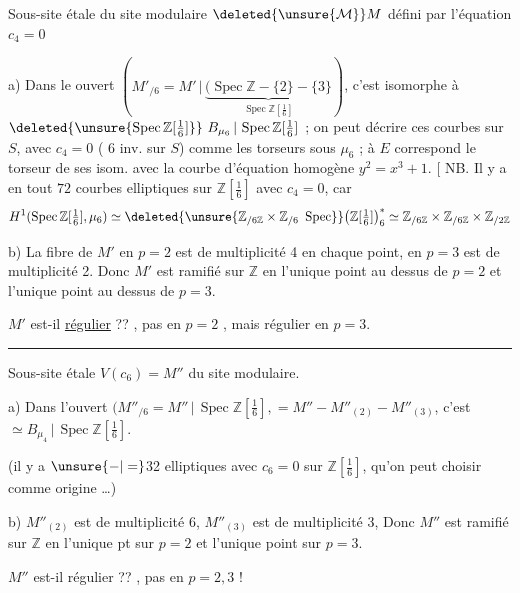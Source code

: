 Sous-site étale  du site modulaire $\deleted{\unsure{\mathcal M}}M$ défini par l'équation $c_4=0$

a) Dans le  ouvert $(M'_{/6}=M'\,|\,\underbrace{(\operatorname{Spec}\mathbb Z-\{2\}-\{3\}}_{\operatorname{Spec}\mathbb Z[\frac16]})$, c'est isomorphe à $\deleted{\unsure{\operatorname{Spec}\mathbb Z[\tfrac16]}}\ B_{\mu_6}\,|\,\operatorname{Spec}\mathbb Z[\tfrac16]$ ; on peut  décrire  ces courbes  sur $S$, avec $c_4=0$ ( $6$ inv. sur $S$) comme les torseurs sous $\mu_6$ ; à $E$ correspond le torseur de ses isom. avec la courbe d'équation  homogène $y^2=x^3+1$. [ NB. Il y a en tout $72$ courbes elliptiques sur $\mathbb Z[\frac16]$ avec $c_4=0$, car
\[
 H^1(\operatorname{Spec}\mathbb Z[\tfrac16],\mu_6)\simeq
 \deleted{\unsure{\mathbb Z_{/6\mathbb Z}\times\mathbb Z_{/6}\ \operatorname{Spec}}}
 \bigl(\mathbb Z[\tfrac16]\bigr)^*_{6}\simeq
 \mathbb Z_{/6\mathbb Z}\times\mathbb Z_{/6\mathbb Z}\times\mathbb Z_{/2\mathbb Z}
\]

b) La fibre de $M'$ en $p=2$ est de  multiplicité 4 en chaque point, en $p=3$ est de multiplicité 2. Donc $M'$ est ramifié sur $\mathbb Z$  en l'unique point au dessus de $p=2$ et l'unique point au dessus de $p=3$.

$M'$ est-il \uline{régulier} ?? , pas en $p=2$ , mais régulier en $p=3$.

\smallskip\noindent\rule{.30\linewidth}{.3pt}

Sous-site étale $V(c_6)=M''$ du site modulaire.

a) Dans l'ouvert $(M''_{/6}=M''\,|\,\operatorname{Spec}\mathbb Z[\tfrac16],=M''-M''_{(2)}-M''_{(3)}$, c'est $\simeq B_{\mu_4}\,|\,\operatorname{Spec}\mathbb Z[\tfrac16]$.

(il y a $\unsure{-|=}$32  elliptiques avec $c_6=0$ sur $\mathbb Z[\frac16]$, qu'on peut choisir comme origine \ldots)

b) $M''_{(2)}$ est de multiplicité 6, $M''_{(3)}$ est de multiplicité 3, Donc $M''$ est ramifié sur $\mathbb Z$  en l'unique pt sur $p=2$ et l'unique point sur $p=3$.

$M''$ est-il régulier ?? , pas en $p=2,3$ !
\\

